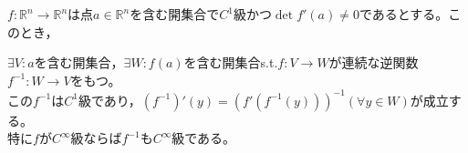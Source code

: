 
\begin{framed}
	\begin{thm}[逆関数の定理]\label{th2.11}
$f:\mathbb{R}^n\to\mathbb{R}^n$は点$a\in\mathbb{R}^n$を含む開集合で$C^1$級かつ$\det f'(a)\neq 0$\footnotemark であるとする。このとき，

		$\exists V:a$を含む開集合，$\exists W:f(a)$を含む開集合s.t.$f:V\to W$が連続な逆関数$f^{-1}:W\to V$をもつ。\\
		この$f^{-1}$は$C^1$級であり，$(f^{-1})'(y)=(f'(f^{-1}(y)))^{-1}(\forall y\in W)$が成立する。\\
		特に$f$が$C^\infty$級ならば$f^{-1}$も$C^\infty$級である。
	\end{thm}
\end{framed}


